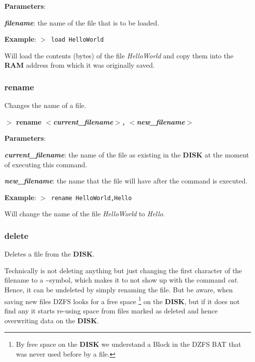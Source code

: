         \textbf{Parameters}:

        \hspace{1cm}\textbf{\textit{filename}}: the name of the file that is to
        be loaded.

        \textbf{Example}: \texttt{$>$ load HelloWorld}

        Will load the contents (bytes) of the file \textit{HelloWorld} and copy
        them into the \textbf{RAM} address from which it was originally saved.

        \subsubsection{{rename}}
        Changes the name of a file.

        \hspace{1.9cm}\textbf{$>$ rename \textit{$<$current\_filename$>$,
        $<$new\_filename$>$}}

        \textbf{Parameters}:

        \hspace{1cm}\textbf{\textit{current\_filename}}: the name of the file as
        existing in the \textbf{DISK} at the moment of executing this command.
        
        \hspace{1cm}\textbf{\textit{new\_filename}}: the name that the file will
        have after the command is executed.

        \textbf{Example}: \texttt{$>$ rename HelloWorld,Hello}

        Will change the name of the file \textit{HelloWorld} to \textit{Hello}.

        \subsubsection{{delete}}
        Deletes a file from the \textbf{DISK}.

        Technically is not deleting anything but just changing the first
        character of the filename to a \textasciitilde symbol, which makes it to
        not show up with the command \textit{cat}. Hence, it can be undeleted by
        simply renaming the file. But be aware, when saving new files DZFS looks
        for a free space \footnote{By free space on the \textbf{DISK} we
        understand a Block in the DZFS BAT that was never used before by a
        file.} on the \textbf{DISK}, but if it does not find any it starts
        re-using space from files marked as deleted and hence overwriting data
        on the \textbf{DISK}.

